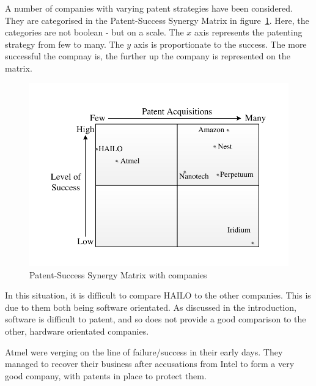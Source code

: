 {}

A number of companies with varying patent strategies have been considered.
They are categorised in the Patent-Success Synergy Matrix in figure~\ref{fig:pssm:companies}.
Here, the categories are not boolean - but on a scale. 
The $x$ axis represents the patenting strategy from few to many.
The $y$ axis is proportionate to the success. 
The more successful the compnay is, the further up the company is represented on the matrix.
\begin{figure}[!h]
\centering
\includegraphics{Figures/SuccessMatrixScale.pdf}
\caption{Patent-Success Synergy Matrix with companies}%
\label{fig:pssm:companies}
\end{figure}

In this situation, it is difficult to compare HAILO to the other companies. 
This is due to them both being software orientated. 
As discussed in the introduction, software is difficult to patent, and so does not provide a good comparison to the other, hardware orientated companies.

Atmel were verging on the line of failure/success in their early days. 
They managed to recover their business after accusations from Intel to form a very good company, with patents in place to protect them.


